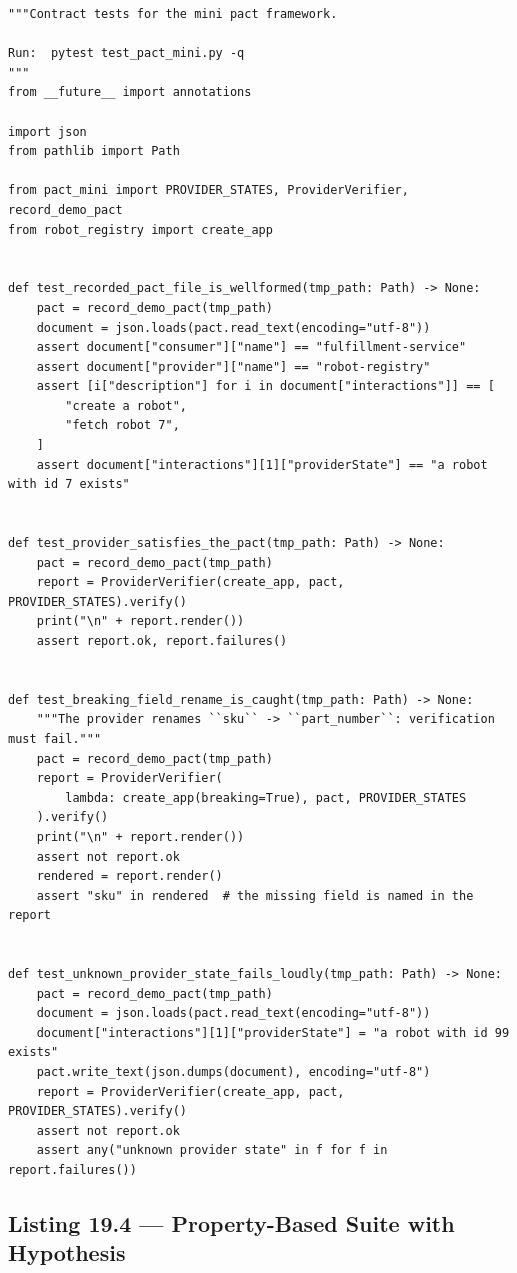 \begin{verbatim}
"""Contract tests for the mini pact framework.

Run:  pytest test_pact_mini.py -q
"""
from __future__ import annotations

import json
from pathlib import Path

from pact_mini import PROVIDER_STATES, ProviderVerifier, record_demo_pact
from robot_registry import create_app


def test_recorded_pact_file_is_wellformed(tmp_path: Path) -> None:
    pact = record_demo_pact(tmp_path)
    document = json.loads(pact.read_text(encoding="utf-8"))
    assert document["consumer"]["name"] == "fulfillment-service"
    assert document["provider"]["name"] == "robot-registry"
    assert [i["description"] for i in document["interactions"]] == [
        "create a robot",
        "fetch robot 7",
    ]
    assert document["interactions"][1]["providerState"] == "a robot with id 7 exists"


def test_provider_satisfies_the_pact(tmp_path: Path) -> None:
    pact = record_demo_pact(tmp_path)
    report = ProviderVerifier(create_app, pact, PROVIDER_STATES).verify()
    print("\n" + report.render())
    assert report.ok, report.failures()


def test_breaking_field_rename_is_caught(tmp_path: Path) -> None:
    """The provider renames ``sku`` -> ``part_number``: verification must fail."""
    pact = record_demo_pact(tmp_path)
    report = ProviderVerifier(
        lambda: create_app(breaking=True), pact, PROVIDER_STATES
    ).verify()
    print("\n" + report.render())
    assert not report.ok
    rendered = report.render()
    assert "sku" in rendered  # the missing field is named in the report


def test_unknown_provider_state_fails_loudly(tmp_path: Path) -> None:
    pact = record_demo_pact(tmp_path)
    document = json.loads(pact.read_text(encoding="utf-8"))
    document["interactions"][1]["providerState"] = "a robot with id 99 exists"
    pact.write_text(json.dumps(document), encoding="utf-8")
    report = ProviderVerifier(create_app, pact, PROVIDER_STATES).verify()
    assert not report.ok
    assert any("unknown provider state" in f for f in report.failures())
\end{verbatim}

\subsection{Listing 19.4 --- Property-Based Suite with Hypothesis}
\label{sec:ch19-listing-pbt}

